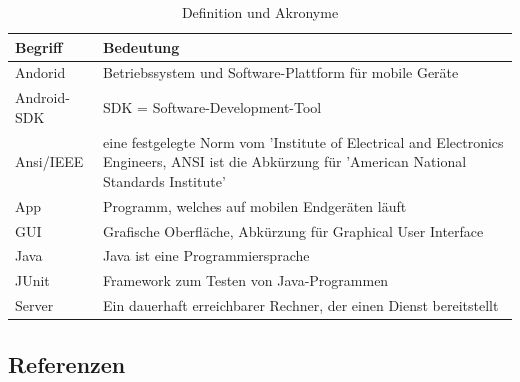 \documentclass[fontsize=12pt,paper=a4,twoside]{scrartcl}
\begin{document}
\begin{table}
\caption{Definition und Akronyme}
\centering
\begin{tabular}{p{7cm}|p{7cm}}
\hline Begriff & Bedeutung\\ \hline
\hline Andorid & Betriebssystem und Software-Plattform für mobile Geräte\\
\hline Android-SDK & SDK = Software-Development-Tool\\
\hline Ansi/IEEE & eine festgelegte Norm vom 'Institute of Electrical and Electronics Engineers, ANSI ist die Abkürzung für 'American National Standards Institute'\\
\hline App & Programm, welches auf mobilen Endgeräten läuft\\
\hline GUI & Grafische Oberfläche, Abkürzung für Graphical User Interface\\
\hline Java & Java ist eine Programmiersprache\\
\hline JUnit & Framework zum Testen von Java-Programmen\\
\hline Server & Ein dauerhaft erreichbarer Rechner, der einen Dienst bereitstellt\\
\hline
\end{tabular}
\end{table}

\subsection{Referenzen}
\end{document}
